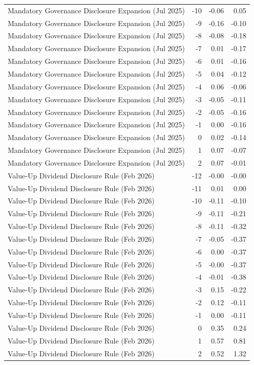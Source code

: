 \begin{table}
\begin{tabular}{lrrr}
Mandatory Governance Disclosure Expansion (Jul 2025) & -10 & -0.06 & 0.05 \\
Mandatory Governance Disclosure Expansion (Jul 2025) & -9 & -0.16 & -0.10 \\
Mandatory Governance Disclosure Expansion (Jul 2025) & -8 & -0.08 & -0.18 \\
Mandatory Governance Disclosure Expansion (Jul 2025) & -7 & 0.01 & -0.17 \\
Mandatory Governance Disclosure Expansion (Jul 2025) & -6 & 0.01 & -0.16 \\
Mandatory Governance Disclosure Expansion (Jul 2025) & -5 & 0.04 & -0.12 \\
Mandatory Governance Disclosure Expansion (Jul 2025) & -4 & 0.06 & -0.06 \\
Mandatory Governance Disclosure Expansion (Jul 2025) & -3 & -0.05 & -0.11 \\
Mandatory Governance Disclosure Expansion (Jul 2025) & -2 & -0.05 & -0.16 \\
Mandatory Governance Disclosure Expansion (Jul 2025) & -1 & 0.00 & -0.16 \\
Mandatory Governance Disclosure Expansion (Jul 2025) & 0 & 0.02 & -0.14 \\
Mandatory Governance Disclosure Expansion (Jul 2025) & 1 & 0.07 & -0.07 \\
Mandatory Governance Disclosure Expansion (Jul 2025) & 2 & 0.07 & -0.01 \\
Value-Up Dividend Disclosure Rule (Feb 2026) & -12 & -0.00 & -0.00 \\
Value-Up Dividend Disclosure Rule (Feb 2026) & -11 & 0.01 & 0.00 \\
Value-Up Dividend Disclosure Rule (Feb 2026) & -10 & -0.11 & -0.10 \\
Value-Up Dividend Disclosure Rule (Feb 2026) & -9 & -0.11 & -0.21 \\
Value-Up Dividend Disclosure Rule (Feb 2026) & -8 & -0.11 & -0.32 \\
Value-Up Dividend Disclosure Rule (Feb 2026) & -7 & -0.05 & -0.37 \\
Value-Up Dividend Disclosure Rule (Feb 2026) & -6 & 0.00 & -0.37 \\
Value-Up Dividend Disclosure Rule (Feb 2026) & -5 & -0.00 & -0.37 \\
Value-Up Dividend Disclosure Rule (Feb 2026) & -4 & -0.01 & -0.38 \\
Value-Up Dividend Disclosure Rule (Feb 2026) & -3 & 0.15 & -0.22 \\
Value-Up Dividend Disclosure Rule (Feb 2026) & -2 & 0.12 & -0.11 \\
Value-Up Dividend Disclosure Rule (Feb 2026) & -1 & 0.00 & -0.11 \\
Value-Up Dividend Disclosure Rule (Feb 2026) & 0 & 0.35 & 0.24 \\
Value-Up Dividend Disclosure Rule (Feb 2026) & 1 & 0.57 & 0.81 \\
Value-Up Dividend Disclosure Rule (Feb 2026) & 2 & 0.52 & 1.32 \\
\bottomrule
\end{tabular}
\end{table}
